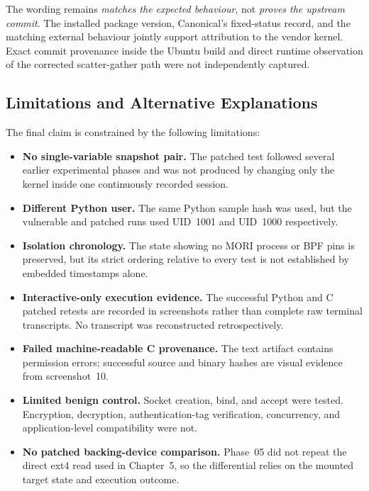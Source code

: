 The wording remains \emph{matches the expected behaviour}, not \emph{proves the
upstream commit}. The installed package version, Canonical's fixed-status
record, and the matching external behaviour jointly support attribution to the
vendor kernel. Exact commit provenance inside the Ubuntu build and direct
runtime observation of the corrected scatter-gather path were not independently
captured.

\subsection{Limitations and Alternative Explanations}

The final claim is constrained by the following limitations:

\begin{itemize}
    \item \textbf{No single-variable snapshot pair.} The patched test followed
    several earlier experimental phases and was not produced by changing only
    the kernel inside one continuously recorded session.

    \item \textbf{Different Python user.} The same Python sample hash was used,
    but the vulnerable and patched runs used UID~1001 and UID~1000
    respectively.

    \item \textbf{Isolation chronology.} The state showing no MORI process or
    BPF pins is preserved, but its strict ordering relative to every test is not
    established by embedded timestamps alone.

    \item \textbf{Interactive-only execution evidence.} The successful Python
    and C patched retests are recorded in screenshots rather than complete raw
    terminal transcripts. No transcript was reconstructed retrospectively.

    \item \textbf{Failed machine-readable C provenance.} The text artifact
    contains permission errors; successful source and binary hashes are visual
    evidence from screenshot~10.

    \item \textbf{Limited benign control.} Socket creation, bind, and accept
    were tested. Encryption, decryption, authentication-tag verification,
    concurrency, and application-level compatibility were not.

    \item \textbf{No patched backing-device comparison.} Phase~05 did not
    repeat the direct ext4 read used in Chapter~5, so the differential relies on
    the mounted target state and execution outcome.


\end{itemize}
